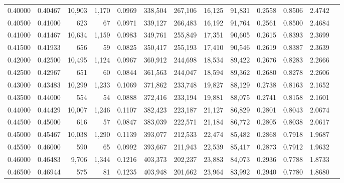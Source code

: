 \begin{tabular}{rrrrrrrrrrrrr}
0.40000 & 0.40467 & 10,903 & 1,170 &                                     0.0969 & 338,504 & 267,106 &  16,125 &  91,831 & 0.2558 & 0.8506 & 2.4742 \\
0.40500 & 0.41000 &    623 &    67 &                                     0.0971 & 339,127 & 266,483 &  16,192 &  91,764 & 0.2561 & 0.8500 & 2.4684 \\
0.41000 & 0.41467 & 10,634 & 1,159 &                                     0.0983 & 349,761 & 255,849 &  17,351 &  90,605 & 0.2615 & 0.8393 & 2.3699 \\
0.41500 & 0.41933 &    656 &    59 &                                     0.0825 & 350,417 & 255,193 &  17,410 &  90,546 & 0.2619 & 0.8387 & 2.3639 \\
0.42000 & 0.42500 & 10,495 & 1,124 &                                     0.0967 & 360,912 & 244,698 &  18,534 &  89,422 & 0.2676 & 0.8283 & 2.2666 \\
0.42500 & 0.42967 &    651 &    60 &                                     0.0844 & 361,563 & 244,047 &  18,594 &  89,362 & 0.2680 & 0.8278 & 2.2606 \\
0.43000 & 0.43483 & 10,299 & 1,233 &                                     0.1069 & 371,862 & 233,748 &  19,827 &  88,129 & 0.2738 & 0.8163 & 2.1652 \\
0.43500 & 0.44000 &    554 &    54 &                                     0.0888 & 372,416 & 233,194 &  19,881 &  88,075 & 0.2741 & 0.8158 & 2.1601 \\
0.44000 & 0.44429 & 10,007 & 1,246 &                                     0.1107 & 382,423 & 223,187 &  21,127 &  86,829 & 0.2801 & 0.8043 & 2.0674 \\
0.44500 & 0.45000 &    616 &    57 &                                     0.0847 & 383,039 & 222,571 &  21,184 &  86,772 & 0.2805 & 0.8038 & 2.0617 \\
0.45000 & 0.45467 & 10,038 & 1,290 &                                     0.1139 & 393,077 & 212,533 &  22,474 &  85,482 & 0.2868 & 0.7918 & 1.9687 \\
0.45500 & 0.46000 &    590 &    65 &                                     0.0992 & 393,667 & 211,943 &  22,539 &  85,417 & 0.2873 & 0.7912 & 1.9632 \\
0.46000 & 0.46483 &  9,706 & 1,344 &                                     0.1216 & 403,373 & 202,237 &  23,883 &  84,073 & 0.2936 & 0.7788 & 1.8733 \\
0.46500 & 0.46944 &    575 &    81 &                                     0.1235 & 403,948 & 201,662 &  23,964 &  83,992 & 0.2940 & 0.7780 & 1.8680 \\

\end{tabular}
